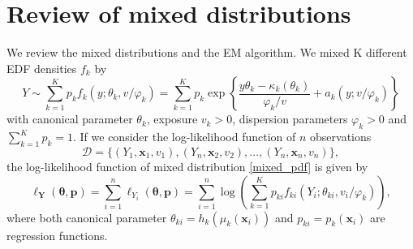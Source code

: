 \documentclass[11pt]{article}
\numberwithin{equation}{section}
\def\bx{\boldsymbol{x}}
\begin{document}
\section{Review of mixed distributions}
We review the mixed distributions and the EM algorithm.
We mixed K different EDF densities $f_k$ by
\begin{equation}
	Y \sim \sum_{k=1}^{K} p_{k} f_{k}\left(y ; \theta_{k}, v / \varphi_{k}\right)=\sum_{k=1}^{K} p_{k} \exp \left\{\frac{y \theta_{k}-\kappa_{k}\left(\theta_{k}\right)}{\varphi_{k} / v}+a_{k}\left(y ; v / \varphi_{k}\right)\right\}
	\label{mixed_pdf}
\end{equation}
with canonical parameter $\theta_k$, exposure $v_k>0$, dispersion parameters $\varphi_k>0$ and $\sum_{k=1}^K p_k =1$. If we consider the log-likelihood function of $n$ observations 
$$\mathcal{D}=\{(Y_1,\bx_1,v_1),(Y_n,\bx_2,v_2),\ldots,(Y_n,\bx_n,v_n)\},$$ the log-likelihood function of mixed distribution \eqref{mixed_pdf} is given by 
\begin{equation}
	\ell_{\boldsymbol{Y}}(\boldsymbol{\theta}, \boldsymbol{p})=\sum_{i=1}^{n} \ell_{Y_{i}}(\boldsymbol{\theta}, \boldsymbol{p})=\sum_{i=1}^{n} \log \left(\sum_{k=1}^{K} p_{ki} f_{ki}\left(Y_{i} ; \theta_{ki}, v_{i} / \varphi_{k}\right)\right),
	\label{loglike_mixed}
\end{equation}
where both canonical parameter $\theta_{ki}=h_k(\mu_k(\bx_i))$ and $p_{ki}=p_{k}(\bx_i)$ are regression functions.
\end{document}
